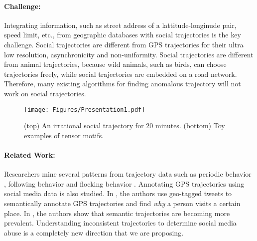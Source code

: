 \paragraph{Challenge:} 

Integrating information, such as street address of a lattitude-longinude pair, speed limit, etc., from geographic databases with social trajectories is the key challenge.
Social trajectories are different from GPS trajectories for their ultra low resolution, asynchronicity and non-uniformity. Social trajectories are different from animal trajectories, because wild animals, such as birds, can choose trajectories freely, while social trajectories are embedded on a road network. Therefore, many existing algorithms for finding anomalous trajectory will not work on social trajectories.

\begin{wrapfigure}{r}{0.2\textwidth}
\vspace{-1.5cm}
\begin{center}
\texttt{[image: Figures/Presentation1.pdf]}
\vspace{-0.6cm}
\caption{(top) An irrational social trajectory for 20 minutes. (bottom) Toy examples of tensor motifs.}
\label{fig:extra}
\end{center}
\vspace{-1.3cm}
\end{wrapfigure}



\paragraph{Related Work:}


Researchers mine several patterns from trajectory data such as periodic behavior \cite{Li2011}, following behavior \cite{Li2013} and flocking behavior \cite{Vieira2009}. Annotating GPS trajectories using social media data \cite{Parent2013,Li2011} is also studied. 
In \cite{Wu2015}, the authors use geo-tagged tweets to semantically annotate GPS trajectories and find {\it why} a person visits a certain place. In \cite{Yan2013}, the authors show that semantic trajectories are becoming more prevalent. Understanding inconsistent trajectories to determine social media abuse is a completely new direction that we are proposing.

